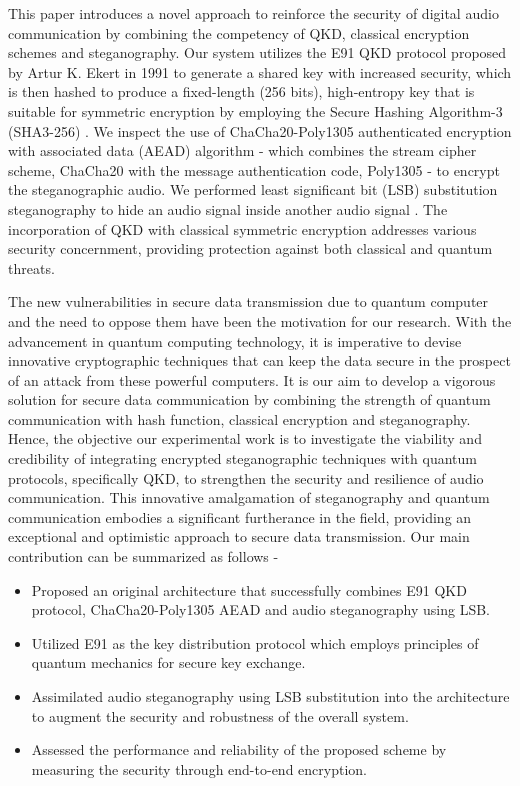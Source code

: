 \documentclass{article}
\begin{document}
This paper introduces a novel approach to reinforce the security of digital audio communication by combining the competency of QKD, classical encryption schemes and steganography. Our system utilizes the E91 QKD protocol proposed by Artur K. Ekert in 1991 \cite{Ekert1991} to generate a shared key with increased security, which is then hashed to produce a fixed-length (256 bits), high-entropy key that is suitable for symmetric encryption by employing the Secure Hashing Algorithm-3 (SHA3-256) \cite{dworkin2015sha}. We inspect the use of ChaCha20-Poly1305 authenticated encryption with associated data (AEAD) algorithm \cite{rfc7539} - which combines the stream cipher scheme, ChaCha20 \cite{bernstein2008chacha} with the message authentication code, Poly1305 \cite{bernstein2005poly1305} - to encrypt the steganographic audio. We performed least significant bit (LSB) substitution steganography to hide an audio signal inside another audio signal \cite{cvejic2002increasing}. The incorporation of QKD with classical symmetric encryption addresses various security concernment, providing protection against both classical and quantum threats.

The new vulnerabilities in secure data transmission due to quantum computer and the need to oppose them have been the motivation for our research. With the advancement in quantum computing technology, it is imperative to devise innovative cryptographic techniques that can keep the data secure in the prospect of an attack from these powerful computers. It is our aim to develop a vigorous solution for secure data communication by combining the strength of quantum communication with hash function, classical encryption and steganography. Hence, the objective our experimental work is to investigate the viability and credibility of integrating encrypted steganographic techniques with quantum protocols, specifically QKD, to strengthen the security and resilience of audio communication. This innovative amalgamation of steganography and quantum communication embodies a significant furtherance in the field, providing an exceptional and optimistic approach to secure data transmission. Our main contribution can be summarized as follows -
\begin{itemize}
    \item Proposed an original architecture that successfully combines E91 QKD protocol, ChaCha20-Poly1305 AEAD and audio steganography using LSB.
    \item Utilized E91 as the key distribution protocol which employs principles of quantum mechanics for secure key exchange.
    \item Assimilated audio steganography using LSB substitution into the architecture to augment the security and robustness of the overall system.
    \item Assessed the performance and reliability of the proposed scheme by measuring the security through end-to-end encryption.
\end{itemize}
\end{document}
